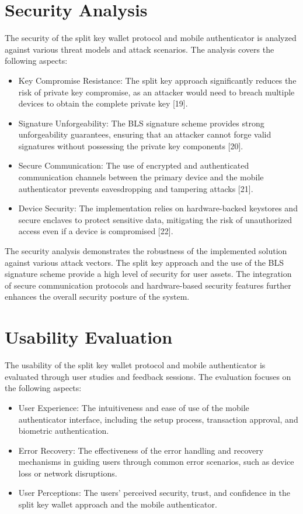 \section{Security Analysis}
The security of the split key wallet protocol and mobile authenticator is analyzed against various threat models and attack scenarios. The analysis covers the following aspects:
\begin{itemize}
    \item Key Compromise Resistance: The split key approach significantly reduces the risk of private key compromise, as an attacker would need to breach multiple devices to obtain the complete private key [19].
    \item Signature Unforgeability: The BLS signature scheme provides strong unforgeability guarantees, ensuring that an attacker cannot forge valid signatures without possessing the private key components [20].
    \item Secure Communication: The use of encrypted and authenticated communication channels between the primary device and the mobile authenticator prevents eavesdropping and tampering attacks [21].
    \item Device Security: The implementation relies on hardware-backed keystores and secure enclaves to protect sensitive data, mitigating the risk of unauthorized access even if a device is compromised [22].
\end{itemize}

The security analysis demonstrates the robustness of the implemented solution against various attack vectors. The split key approach and the use of the BLS signature scheme provide a high level of security for user assets. The integration of secure communication protocols and hardware-based security features further enhances the overall security posture of the system.

\section{Usability Evaluation}
The usability of the split key wallet protocol and mobile authenticator is evaluated through user studies and feedback sessions. The evaluation focuses on the following aspects:
\begin{itemize}
    \item User Experience: The intuitiveness and ease of use of the mobile authenticator interface, including the setup process, transaction approval, and biometric authentication.
    \item Error Recovery: The effectiveness of the error handling and recovery mechanisms in guiding users through common error scenarios, such as device loss or network disruptions.
    \item User Perceptions: The users' perceived security, trust, and confidence in the split key wallet approach and the mobile authenticator.
\end{itemize}

